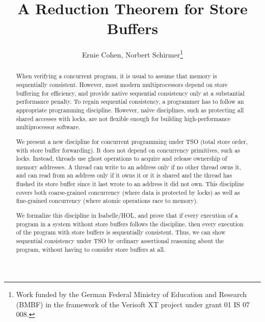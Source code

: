 \documentclass[11pt]{llncs}
\begin{document}

  \title{A Reduction Theorem for Store Buffers}

  \author{Ernie Cohen, Norbert Schirmer\fnmsep\thanks{Work funded by the German Federal Ministry of Education and Research (BMBF) in the framework of the Verisoft XT project under grant 01 IS 07 008.}}


\maketitle


\begin{abstract}

When verifying a concurrent program, it is usual to assume that memory
is sequentially consistent.  However, most modern multiprocessors
depend on store buffering for efficiency, and provide native
sequential consistency only at a substantial performance penalty.  To
regain sequential consistency, a programmer has to follow an
appropriate programming discipline. However, na\"ive disciplines,
such as protecting all shared accesses with locks, are not flexible
enough for building high-performance multiprocessor software.

We present a new discipline for concurrent programming under TSO
(total store order, with store buffer forwarding). It does not depend
on concurrency primitives, such as locks. Instead, threads use ghost
operations to acquire and release ownership of memory addresses. A
thread can write to an address only if no other thread owns it, and
can read from an address only if it owns it or it is shared and the thread
has flushed its store buffer since it last wrote to an address it did
not own. This discipline covers both coarse-grained concurrency (where
data is protected by locks) as well as fine-grained concurrency (where
atomic operations race to memory).

We formalize this discipline in Isabelle/HOL, and prove that if every
execution of a program in a system without store buffers follows the
discipline, then every execution of the program with store buffers is
sequentially consistent. Thus, we can show sequential consistency
under TSO by ordinary assertional reasoning about the program, without
having to consider store buffers at all.

\end{abstract}
\end{document}

